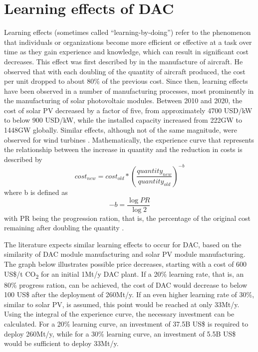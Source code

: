 \chapter{Learning effects of DAC}
Learning effects (sometimes called “learning-by-doing”) refer to the phenomenon that individuals or organizations become more efficient or effective at a task over time as they gain experience and knowledge, which can result in significant cost decreases.
This effect was first described by \textcite{Wright1936FactorsAirplanes} in the manufacture of aircraft. He observed that with each doubling of the quantity of aircraft produced, the cost per unit dropped to about 80\% of the previous cost. Since then, learning effects have been observed in a number of manufacturing processes, most prominently in the manufacturing of solar photovoltaic modules. Between 2010 and 2020, the cost of solar PV decreased by a factor of five, from approximately 4700 USD/kW to below 900 USD/kW, while the installed capacity increased from 222GW to 1448GW globally. Similar effects, although not of the same magnitude, were observed for wind turbines \parencite{Shrestha2022LearningDeployment}. Mathematically, the experience curve that represents the relationship between the increase in quantity and the reduction in costs is described by \begin{equation} {cost_{new} = cost_{old}*\left( \frac{quantity_{new}}{quantity_{old}} \right)^{-b}} \end{equation} where b is defined as \begin{equation} -b = \frac{\log{PR}}{\log{2}} \end{equation} with PR being the progression ration, that is, the percentage of the original cost remaining after doubling the quantity \parencite{Fasihi2019Techno-economicPlants}.

The literature expects similar learning effects to occur for DAC, based on the similarity of DAC module manufacturing and solar PV module manufacturing. The graph below illustrates possible price decreases, starting with a cost of 600 US\$/t CO\textsubscript{2} for an initial 1Mt/y DAC plant. If a 20\% learning rate, that is, an 80\% progress ration, can be achieved, the cost of DAC would decrease to below 100 US\$ after the deployment of 260Mt/y. If an even higher learning rate of 30\%, similar to solar PV, is assumed, this point would be reached at only 33Mt/y. Using the integral of the experience curve, the necessary investment can be calculated. For a 20\% learning curve, an investment of 37.5B US\$ is required to deploy 260Mt/y, while for a 30\% learning curve, an investment of 5.5B US\$ would be sufficient to deploy 33Mt/y.

